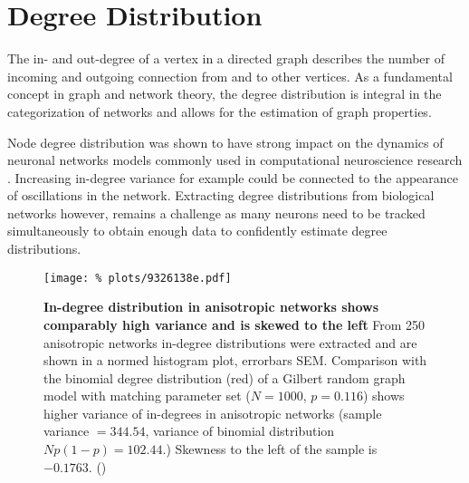 

\section{Degree Distribution}\label{sec:degree_distribution}


The in- and out-degree of a vertex in a directed graph describes the
number of incoming and outgoing connection from and to other
 vertices. As a
fundamental concept in graph and network theory, the degree
distribution is integral in the categorization of networks and allows
for the estimation of graph properties. 

Node degree distribution was shown to have strong impact on the
dynamics of neuronal networks models commonly used in computational
neuroscience research \parencite{Roxin2011, Pernice2013}. Increasing in-degree
variance for example could be connected to the appearance of
oscillations in the network. Extracting degree distributions from
biological networks however, remains a challenge as many neurons need
to be tracked simultaneously to obtain enough data to confidently
estimate degree distributions.

\begin{figure}[H]
  \centering
  \texttt{[image: \%
    plots/9326138e.pdf]}
  \caption{\textbf{In-degree distribution in anisotropic networks
      shows comparably high variance and is skewed to the left} From 250
    anisotropic networks in-degree distributions were extracted and
    are shown in a normed histogram plot, errorbars SEM. Comparison with the
    binomial degree distribution (red) of a Gilbert random graph model
    with matching parameter set ($N=1000$, $p =0.116$) shows higher
    variance of in-degrees in anisotropic networks (sample variance $=
    344.54$, variance of binomial distribution $Np(1-p) = 102.44$.)
    Skewness to the left of the sample is $-0.1763.$
    ()}
  \label{fig:in_degree_ER_compare}
\end{figure}

